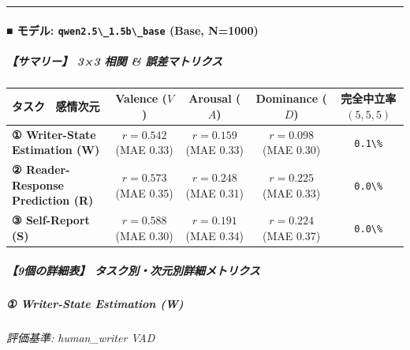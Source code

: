 \vspace{0.5em}\hrule\vspace{0.5em}

\paragraph{■ モデル: \texttt{qwen2.5\textbackslash{}\_1.5b\textbackslash{}\_base} (Base, N=1000)}

\subparagraph{【サマリー】 3×3 相関 \& 誤差マトリクス}
\begin{center}
\small
\begin{tabular}{lcccc}
\toprule
\textbf{タスク \ 感情次元} & \textbf{Valence ($V$)} & \textbf{Arousal ($A$)} & \textbf{Dominance ($D$)} & \textbf{完全中立率 $(5,5,5)$} \\
\midrule
\textbf{① Writer-State Estimation (W)} & \textbf{$r=0.542$} (MAE 0.33) & \textbf{$r=0.159$} (MAE 0.33) & \textbf{$r=0.098$} (MAE 0.30) & \texttt{0.1\textbackslash{}\%} \\
\textbf{② Reader-Response Prediction (R)} & \textbf{$r=0.573$} (MAE 0.35) & \textbf{$r=0.248$} (MAE 0.31) & \textbf{$r=0.225$} (MAE 0.33) & \texttt{0.0\textbackslash{}\%} \\
\textbf{③ Self-Report (S)} & \textbf{$r=0.588$} (MAE 0.30) & \textbf{$r=0.191$} (MAE 0.34) & \textbf{$r=0.224$} (MAE 0.37) & \texttt{0.0\textbackslash{}\%} \\
\bottomrule
\end{tabular}
\end{center}



\subparagraph{【9個の詳細表】 タスク別・次元別詳細メトリクス}

\subparagraph{① Writer-State Estimation (W)}
\textit{評価基準: human\_writer VAD}

